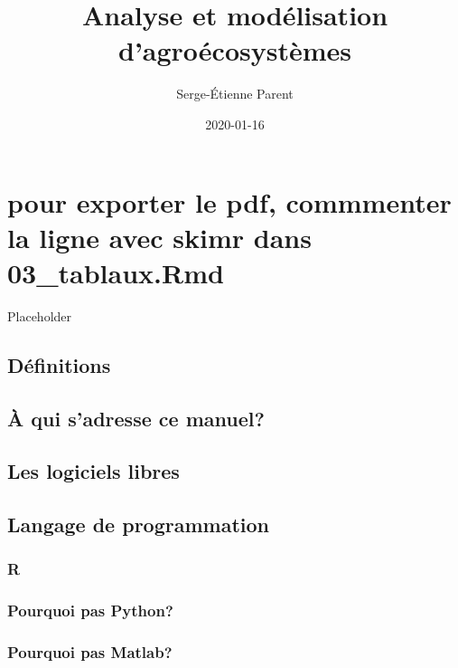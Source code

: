 \documentclass[]{book}
\title{Analyse et modélisation d'agroécosystèmes}
\author{Serge-Étienne Parent}
\date{2020-01-16}
\begin{document}
\maketitle

{
\setcounter{tocdepth}{1}
\tableofcontents
}
\hypertarget{pour-exporter-le-pdf-commmenter-la-ligne-avec-skimr-dans-03_tablaux.rmd}{%
\chapter{pour exporter le pdf, commmenter la ligne avec skimr dans
03\_tablaux.Rmd}\label{pour-exporter-le-pdf-commmenter-la-ligne-avec-skimr-dans-03_tablaux.rmd}}

Placeholder

\hypertarget{duxe9finitions}{%
\section{Définitions}\label{duxe9finitions}}

\hypertarget{uxe0-qui-sadresse-ce-manuel}{%
\section{À qui s'adresse ce manuel?}\label{uxe0-qui-sadresse-ce-manuel}}

\hypertarget{les-logiciels-libres}{%
\section{Les logiciels libres}\label{les-logiciels-libres}}

\hypertarget{langage-de-programmation}{%
\section{Langage de programmation}\label{langage-de-programmation}}

\hypertarget{r}{%
\subsection{R}\label{r}}

\hypertarget{pourquoi-pas-python}{%
\subsection{Pourquoi pas Python?}\label{pourquoi-pas-python}}

\hypertarget{pourquoi-pas-matlab}{%
\subsection{Pourquoi pas Matlab?}\label{pourquoi-pas-matlab}}
\end{document}
